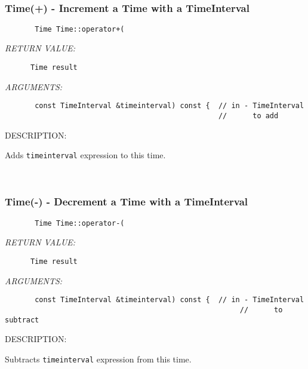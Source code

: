  
\mbox{}\hrulefill\ 
 
\subsubsection [Time(+)] {Time(+) - Increment a Time with a TimeInterval}


  
\begin{verbatim}       Time Time::operator+(\end{verbatim}{\em RETURN VALUE:}
\begin{verbatim}      Time result\end{verbatim}{\em ARGUMENTS:}
\begin{verbatim}       const TimeInterval &timeinterval) const {  // in - TimeInterval
                                                  //      to add\end{verbatim}
{\sf DESCRIPTION:\\ }


      Adds {\tt timeinterval} expression to this time.
   
 
\mbox{}\hrulefill\ 
 
\subsubsection [Time(-)] {Time(-) - Decrement a Time with a TimeInterval}


  
\begin{verbatim}       Time Time::operator-(\end{verbatim}{\em RETURN VALUE:}
\begin{verbatim}      Time result\end{verbatim}{\em ARGUMENTS:}
\begin{verbatim}       const TimeInterval &timeinterval) const {  // in - TimeInterval
                                                       //      to subtract\end{verbatim}
{\sf DESCRIPTION:\\ }


      Subtracts {\tt timeinterval} expression from this time.
   
 
